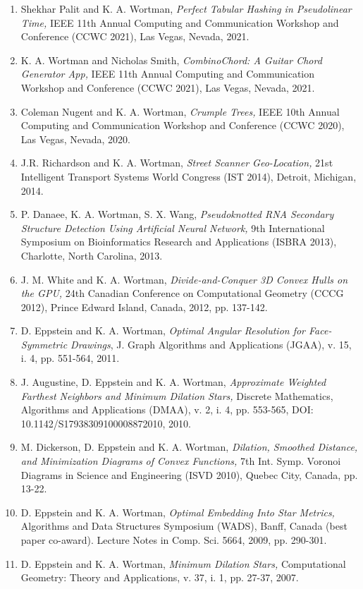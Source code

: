 \documentclass[11pt]{letter}
\begin{document}
\begin{enumerate}
  \item \label{item:ccwc21palit} Shekhar Palit and K. A. Wortman, \emph{Perfect Tabular Hashing in Pseudolinear Time,} IEEE 11th Annual Computing and Communication Workshop and Conference (CCWC 2021), Las Vegas, Nevada, 2021.
  \item \label{item:ccwc21smith} K. A. Wortman and Nicholas Smith, \emph{CombinoChord: A Guitar Chord Generator App,} IEEE 11th Annual Computing and Communication Workshop and Conference (CCWC 2021), Las Vegas, Nevada, 2021.
  \item \label{item:ccwc20} Coleman Nugent and K. A. Wortman, \emph{Crumple Trees,} IEEE 10th Annual Computing and Communication Workshop and Conference (CCWC 2020), Las Vegas, Nevada, 2020.
  \item \label{item:its14} J.R. Richardson and K. A. Wortman, \emph{Street Scanner Geo-Location,} 21st Intelligent Transport Systems World Congress (IST 2014), Detroit, Michigan, 2014.
  \item \label{item:isbra13} P. Danaee, K. A. Wortman, S. X. Wang, \emph{Pseudoknotted RNA Secondary Structure Detection Using Artificial Neural Network,} 9th International Symposium on Bioinformatics Research and Applications (ISBRA 2013), Charlotte, North Carolina, 2013.
  \item \label{item:cccg12} J. M. White and K. A. Wortman, \emph{Divide-and-Conquer 3D Convex Hulls on the GPU,} 24th Canadian Conference on Computational Geometry (CCCG 2012), Prince Edward Island, Canada, 2012, pp. 137-142.
  \item \label{item:oarpdsf_journal} D. Eppstein and K. A. Wortman, \emph{Optimal Angular Resolution for Face-Symmetric Drawings}, J. Graph Algorithms and Applications (JGAA), v. 15, i. 4, pp. 551-564, 2011.
  \item \label{item:awfn_journal} J. Augustine, D. Eppstein and K. A. Wortman, \emph{Approximate Weighted Farthest Neighbors and Minimum Dilation Stars,} Discrete Mathematics, Algorithms and Applications (DMAA), v. 2, i. 4, pp. 553-565, DOI: 10.1142/S17938309100008872010, 2010. 
  \item M. Dickerson, D. Eppstein and K. A. Wortman, \emph{Dilation, Smoothed Distance, and Minimization Diagrams of Convex Functions,} 7th Int. Symp. Voronoi Diagrams in Science and Engineering (ISVD 2010), Quebec City, Canada, pp. 13-22.
  \item \label{item:star_metrics} D. Eppstein and K. A. Wortman, \emph{Optimal Embedding Into Star Metrics,} Algorithms and Data Structures Symposium (WADS), Banff, Canada (best paper co-award).  Lecture Notes in Comp. Sci. 5664, 2009, pp. 290-301.
  \item \label{item:mds_journal} D. Eppstein and K. A. Wortman, \emph{Minimum Dilation Stars,} Computational Geometry: Theory and Applications, v. 37, i. 1, pp. 27-37, 2007.
\end{enumerate}
\end{document}
